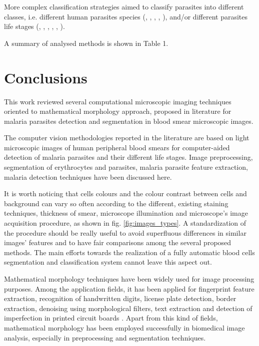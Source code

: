 \documentclass[sensors,review,submit,moreauthors,pdftex,10pt,a4paper]{mdpi}
\begin{document}
More complex classification strategies aimed to classify parasites into different classes, i.e. different human parasites species (\cite{Ahirwar2012}, \cite{Das2013}, \cite{Das2014}, \cite{Khan2011}, \cite{Tek2010}),
and/or different parasites life stages (\cite{Anggraini2011}, \cite{Das2013}, \cite{Das2014}, \cite{DiRuberto2002}, \cite{Diaz2009}, \cite{Tek2010}).

A summary of analysed methods is shown in Table 1.


\section{Conclusions}
This work reviewed several computational microscopic imaging techniques oriented to mathematical morphology approach, proposed in literature for malaria parasites detection and segmentation in blood smear microscopic images.

The computer vision methodologies reported in the literature are based on light microscopic images of human peripheral blood smears for computer-aided detection of malaria parasites and their different life stages.
Image preprocessing, segmentation of erythrocytes and parasites, malaria parasite feature extraction, malaria detection techniques have been discussed here.

It is worth noticing that cells colours and the colour contrast between cells and background can vary so often according to the different, existing staining techniques, thickness of smear, microscope illumination and microscope's image acquisition procedure, as shown in fig. \ref{fig:images_types}. A standardization of the procedure should be really useful to avoid superfluous differences in similar images' features and to have fair comparisons among the several proposed methods. The main efforts towards the realization of a fully automatic blood cells segmentation and classification system cannot leave this aspect out.

Mathematical morphology techniques have been widely used for image processing purposes. Among the application fields, it has been applied for fingerprint feature extraction, recognition of handwritten digits, license plate detection, border extraction, denoising using morphological filters, text extraction and detection of imperfection in printed circuit boards \cite{Kaur2013}. Apart from this kind of fields, mathematical morphology has been employed successfully in biomedical image analysis, especially in preprocessing and segmentation techniques.
\end{document}
